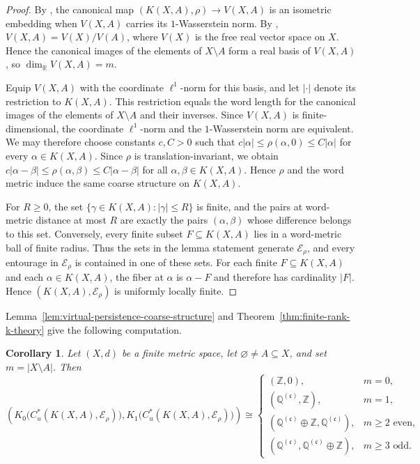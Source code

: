 \documentclass[pdflatex,sn-mathphys-num]{sn-jnl}%
\theoremstyle{plain}
\newtheorem{corollary}[theorem]{Corollary}
\theoremstyle{remark}
\theoremstyle{definition}
\numberwithin{equation}{section}
\begin{document}
\begin{proof}
By \cite[Corollary~7.10]{bubenik2022virtual}, the canonical map \( (K(X,A),\rho)\to V(X,A) \) is an isometric embedding when \( V(X,A) \) carries its \( 1 \)-Wasserstein norm. By \cite[pp.~468, 472]{bubenik2022virtual}, \( V(X,A)=V(X)/V(A) \), where \( V(X) \) is the free real vector space on \( X \). Hence the canonical images of the elements of \( X\setminus A \) form a real basis of \( V(X,A) \), so \( \dim_{\mathbb R}V(X,A)=m \).

Equip \( V(X,A) \) with the coordinate \( \ell^1 \)-norm for this basis, and let \( |\cdot| \) denote its restriction to \( K(X,A) \). This restriction equals the word length for the canonical images of the elements of \( X\setminus A \) and their inverses. Since \( V(X,A) \) is finite-dimensional, the coordinate \( \ell^1 \)-norm and the \( 1 \)-Wasserstein norm are equivalent. We may therefore choose constants \( c,C>0 \) such that \( c|\alpha|\leq \rho(\alpha,0)\leq C|\alpha| \) for every \( \alpha\in K(X,A) \). Since \( \rho \) is translation-invariant, we obtain \( c|\alpha-\beta|\leq \rho(\alpha,\beta)\leq C|\alpha-\beta| \) for all \( \alpha,\beta\in K(X,A) \). Hence \( \rho \) and the word metric induce the same coarse structure on \( K(X,A) \).

For \( R\geq0 \), the set \( \{\gamma\in K(X,A):|\gamma|\leq R\} \) is finite, and the pairs at word-metric distance at most \( R \) are exactly the pairs \( (\alpha,\beta) \) whose difference belongs to this set. Conversely, every finite subset \( F\subseteq K(X,A) \) lies in a word-metric ball of finite radius. Thus the sets in the lemma statement generate \( \mathcal E_\rho \), and every entourage in \( \mathcal E_\rho \) is contained in one of these sets. For each finite \( F\subseteq K(X,A) \) and each \( \alpha\in K(X,A) \), the fiber at \( \alpha \) is \( \alpha-F \) and therefore has cardinality \( |F| \). Hence \( (K(X,A),\mathcal E_\rho) \) is uniformly locally finite.
\end{proof}

Lemma~\ref{lem:virtual-persistence-coarse-structure} and Theorem~\ref{thm:finite-rank-k-theory} give the following computation.

\begin{corollary}
\label{cor:virtual-persistence-k-theory}
Let \( (X,d) \) be a finite metric space, let \( \varnothing\neq A\subseteq X \), and set \( m=|X\setminus A| \). Then
\[
\left(
K_0\bigl(C_u^*(K(X,A),\mathcal E_\rho)\bigr),
K_1\bigl(C_u^*(K(X,A),\mathcal E_\rho)\bigr)
\right)
\cong
\begin{cases}
\left(
\mathbb Z,
0
\right),
& m=0,\\[1ex]
\left(
\mathbb Q^{(\mathfrak c)},
\mathbb Z
\right),
& m=1,\\[1ex]
\left(
\mathbb Q^{(\mathfrak c)}
\oplus
\mathbb Z,
\mathbb Q^{(\mathfrak c)}
\right),
& m\geq2 \text{ even},\\[1ex]
\left(
\mathbb Q^{(\mathfrak c)},
\mathbb Q^{(\mathfrak c)}
\oplus
\mathbb Z
\right),
& m\geq3 \text{ odd}.
\end{cases}
\]
\end{corollary}
\end{document}
